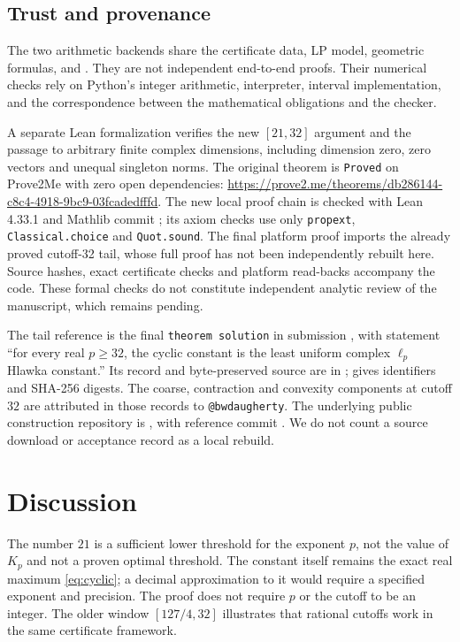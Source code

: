 \documentclass[11pt,a4paper]{article}
\theoremstyle{remark}\newtheorem{remark}[theorem]{Remark}
\begin{document}
\subsection{Trust and provenance}
The two arithmetic backends share the certificate data, LP model,
geometric formulas, and . They are not independent
end-to-end proofs. Their numerical checks rely on Python's integer
arithmetic, interpreter, interval implementation, and the correspondence
between the mathematical obligations and the checker.

A separate Lean formalization verifies the new $[21,32]$ argument and
the passage to arbitrary finite complex dimensions, including dimension
zero, zero vectors and unequal singleton norms. The original theorem
 is
\texttt{Proved} on Prove2Me with zero open dependencies:
\url{https://prove2.me/theorems/db286144-c8c4-4918-9bc9-03fcadedfffd}.
The new local proof chain is checked with Lean 4.33.1 and Mathlib commit
; its axiom checks use only
\texttt{propext}, \texttt{Classical.choice} and \texttt{Quot.sound}.
The final platform proof imports the already proved cutoff-32 tail,
whose full proof has not been independently rebuilt here. Source hashes,
exact certificate checks and platform read-backs accompany the code.
These formal checks do not constitute independent analytic review of the
manuscript, which remains pending.

The tail reference is the final \texttt{theorem solution} in submission
, with statement
``for every real $p\ge32$, the cyclic constant is the least uniform
complex $\ell_p$ Hlawka constant.'' Its record and byte-preserved source
are in ;  gives identifiers
and SHA-256 digests. The coarse, contraction and convexity components at
cutoff $32$ are attributed in those records to \texttt{@bwdaugherty}.
The underlying public construction repository is \cite{savarin}, with
reference commit .
We do not count a source download or acceptance record as a local rebuild.

\section{Discussion}
The number $21$ is a sufficient lower threshold for the exponent $p$,
not the value of $K_p$ and not a proven optimal threshold. The constant
itself remains the exact real maximum \eqref{eq:cyclic}; a decimal
approximation to it would require a specified exponent and precision.
The proof does not require $p$ or the cutoff to be an integer. The older
window $[127/4,32]$ illustrates that rational cutoffs work in the same
certificate framework.
\end{document}
